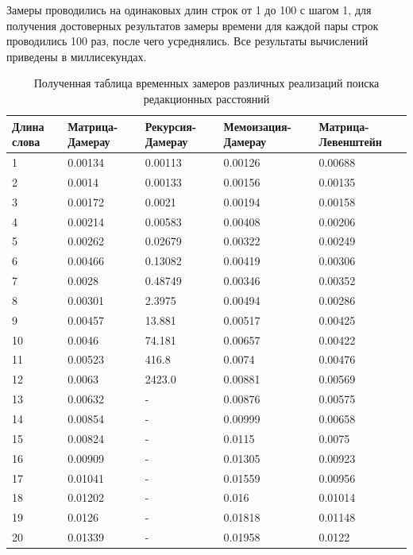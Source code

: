 Замеры проводились на одинаковых длин строк от 1 до 100 с шагом 1, для получения достоверных результатов замеры 
времени для каждой пары строк проводились 100 раз, после чего усреднялись. Все результаты вычислений приведены в миллисекундах.
\begin{table}[!ht]
    \centering
	\label{t:timings}
	\tiny
	\caption{Полученная таблица временных замеров различных реализаций поиска редакционных расстояний}
    \begin{tabular}{|l|l|l|l|l|}
    \hline
        Длина слова & Матрица-Дамерау & Рекурсия-Дамерау & Мемоизация-Дамерау & Матрица-Левенштейн \\ \hline
        1 & 0.00134 & 0.00113 & 0.00126 & 0.00688 \\ \hline
        2 & 0.0014 & 0.00133 & 0.00156 & 0.00135 \\ \hline
        3 & 0.00172 & 0.0021 & 0.00194 & 0.00158 \\ \hline
        4 & 0.00214 & 0.00583 & 0.00408 & 0.00206 \\ \hline
        5 & 0.00262 & 0.02679 & 0.00322 & 0.00249 \\ \hline
        6 & 0.00466 & 0.13082 & 0.00419 & 0.00306 \\ \hline
        7 & 0.0028 & 0.48749 & 0.00346 & 0.00352 \\ \hline
        8 & 0.00301 & 2.3975 & 0.00494 & 0.00286 \\ \hline
        9 & 0.00457 & 13.881 & 0.00517 & 0.00425 \\ \hline
        10 & 0.0046 & 74.181 & 0.00657 & 0.00422 \\ \hline
        11 & 0.00523 & 416.8 & 0.0074 & 0.00476 \\ \hline
        12 & 0.0063 & 2423.0 & 0.00881 & 0.00569 \\ \hline
        13 & 0.00632 & - & 0.00876 & 0.00575 \\ \hline
        14 & 0.00854 & - & 0.00999 & 0.00658 \\ \hline
        15 & 0.00824 & - & 0.0115 & 0.0075 \\ \hline
        16 & 0.00909 & - & 0.01305 & 0.00923 \\ \hline
        17 & 0.01041 & - & 0.01559 & 0.00956 \\ \hline
        18 & 0.01202 & - & 0.016 & 0.01014 \\ \hline
        19 & 0.0126 & - & 0.01818 & 0.01148 \\ \hline
        20 & 0.01339 & - & 0.01958 & 0.0122 \\ \hline

\end{tabular}
\end{table}
